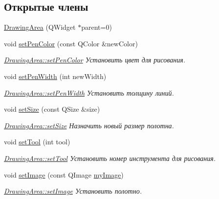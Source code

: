 \subsection*{Открытые члены}
\begin{DoxyCompactItemize}
\item 
\hyperlink{class_drawing_area_a95168b77c2ff299f898fd0966aa21fd6}{Drawing\+Area} (Q\+Widget $\ast$parent=0)
\item 
void \hyperlink{class_drawing_area_afe42bde48cab8cefce39df6c6baffceb}{set\+Pen\+Color} (const Q\+Color \&new\+Color)
\begin{DoxyCompactList}\small\item\em \hyperlink{class_drawing_area_afe42bde48cab8cefce39df6c6baffceb}{Drawing\+Area\+::set\+Pen\+Color} Установить цвет для рисования. \end{DoxyCompactList}\item 
void \hyperlink{class_drawing_area_ad79225ca90fc7d2bb3218f00fe3a1af1}{set\+Pen\+Width} (int new\+Width)
\begin{DoxyCompactList}\small\item\em \hyperlink{class_drawing_area_ad79225ca90fc7d2bb3218f00fe3a1af1}{Drawing\+Area\+::set\+Pen\+Width} Установить толщину линий. \end{DoxyCompactList}\item 
void \hyperlink{class_drawing_area_a5c24d1b5264883bc95be51d0534776f8}{set\+Size} (const Q\+Size \&size)
\begin{DoxyCompactList}\small\item\em \hyperlink{class_drawing_area_a5c24d1b5264883bc95be51d0534776f8}{Drawing\+Area\+::set\+Size} Назначить новый размер полотна. \end{DoxyCompactList}\item 
void \hyperlink{class_drawing_area_ae58ff40622f3795130c0d46bf6aa6efc}{set\+Tool} (int tool)
\begin{DoxyCompactList}\small\item\em \hyperlink{class_drawing_area_ae58ff40622f3795130c0d46bf6aa6efc}{Drawing\+Area\+::set\+Tool} Установить номер инструмента для рисования. \end{DoxyCompactList}\item 
void \hyperlink{class_drawing_area_aa62f91056d26319b0c49a96df35c17f9}{set\+Image} (const Q\+Image \hyperlink{class_drawing_area_a420f3cdf3a9f6df2f65d3a1e1b4c9d4d}{my\+Image})
\begin{DoxyCompactList}\small\item\em \hyperlink{class_drawing_area_aa62f91056d26319b0c49a96df35c17f9}{Drawing\+Area\+::set\+Image} Установить полотно. \end{DoxyCompactList}\item 

\end{DoxyCompactItemize}
